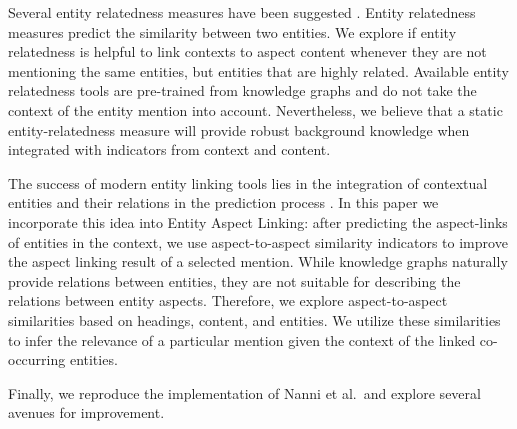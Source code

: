 Several entity relatedness measures have been suggested \cite{ristoski2016rdf2vec, ruback2018computing, zeng2019measuring, ponza2017two}. Entity relatedness measures predict the similarity between two entities. We explore if entity relatedness is helpful to link contexts to aspect content whenever they are not mentioning the same entities, but entities that are highly related.
Available entity relatedness tools \cite{piccinno2014wat} are pre-trained from knowledge graphs and do not take the context of the entity mention into account. Nevertheless, we believe that a static entity-relatedness measure will provide robust background knowledge when integrated with indicators from context and content.

The success of modern entity linking tools lies in the integration of contextual entities and their relations in the prediction process \cite{ratinov-etal-2011-local, ferragina2010tagme, hoffart2011robust}. In this paper we incorporate this idea into Entity Aspect Linking: after predicting the aspect-links of entities in the context, we use aspect-to-aspect similarity indicators to improve the aspect linking result of a selected mention. While knowledge graphs naturally provide relations between entities, they are not suitable for describing the relations between entity aspects. Therefore, we explore aspect-to-aspect similarities based on headings, content, and entities. We utilize these similarities to infer the relevance of a particular mention given the context of the linked co-occurring entities.
 
Finally, we reproduce the implementation of Nanni et al.\ and explore several avenues for improvement.



